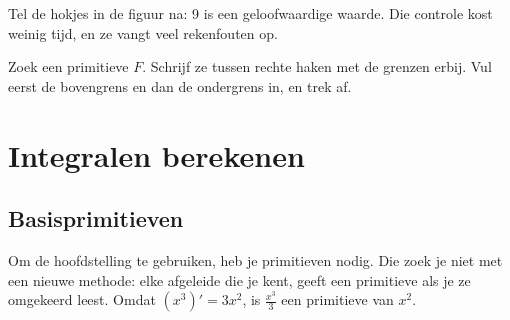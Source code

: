 
Tel de hokjes in de figuur na: 9 is een geloofwaardige waarde. Die controle kost weinig tijd, en ze vangt veel rekenfouten op.

\begin{werkwijze}
Zoek een primitieve $F$. Schrijf ze tussen rechte haken met de grenzen erbij. Vul eerst de bovengrens en dan de ondergrens in, en trek af.
\end{werkwijze}


\begin{oefeningen}
\end{oefeningen}

\section{Integralen berekenen}

\subsection{Basisprimitieven}

Om de hoofdstelling te gebruiken, heb je primitieven nodig. Die zoek je niet met een nieuwe methode: elke afgeleide die je kent, geeft een primitieve als je ze omgekeerd leest. Omdat $(x^3)' = 3x^2$, is $\tfrac{x^3}{3}$ een primitieve van $x^2$.

